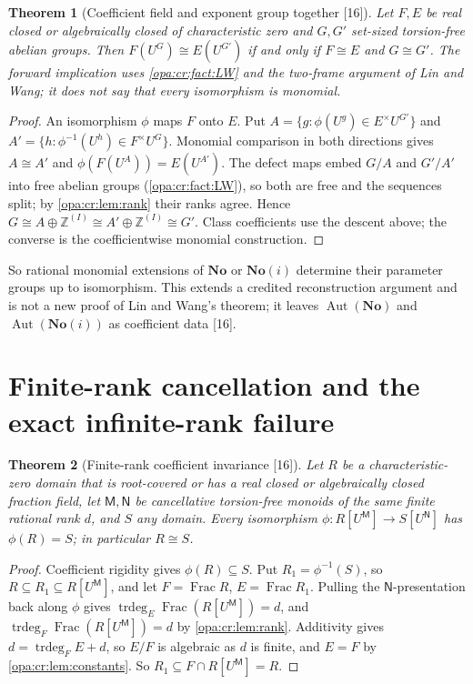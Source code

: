 \documentclass[11pt,oneside]{article}
\numberwithin{equation}{section}
\newtheorem{theorem}{Theorem}[section]
\theoremstyle{definition}
\theoremstyle{remark}
\newcommand{\No}{\mathbf{No}}
\newcommand{\SC}{\mathbf{No}(i)}
\newcommand{\Z}{\mathbb Z}
\newcommand{\Aut}{\operatorname{Aut}}
\newcommand{\Frac}{\operatorname{Frac}}
\newcommand{\trdeg}{\operatorname{trdeg}}
\newcommand{\src}[1]{\textup{\textsf{\small[#1]}}}
\begin{document}
\begin{theorem}[Coefficient field and exponent group together \src{16}]\label{opa:cr:thm:pairrecover}
Let $F,E$ be real closed or algebraically closed of characteristic zero and $G,G'$ set-sized torsion-free abelian groups.
Then $F(U^G)\cong E(U^{G'})$ if and only if $F\cong E$ and $G\cong G'$. The forward implication uses
\cref{opa:cr:fact:LW} and the two-frame argument of Lin and Wang; it does not say that every isomorphism is monomial.
\end{theorem}
\begin{proof}
An isomorphism $\phi$ maps $F$ onto $E$. Put $A=\{g:\phi(U^g)\in E^\times U^{G'}\}$ and $A'=\{h:\phi^{-1}(U^h)\in F^\times U^G\}$.
Monomial comparison in both directions gives $A\cong A'$ and $\phi(F(U^A))=E(U^{A'})$. The defect maps embed $G/A$ and $G'/A'$
into free abelian groups (\cref{opa:cr:fact:LW}), so both are free and the sequences split; by \cref{opa:cr:lem:rank} their
ranks agree. Hence $G\cong A\oplus\Z^{(I)}\cong A'\oplus\Z^{(I)}\cong G'$. Class coefficients use the descent above; the
converse is the coefficientwise monomial construction.
\end{proof}

So rational monomial extensions of $\No$ or $\SC$ determine their parameter groups up to isomorphism. This extends a
credited reconstruction argument and is not a new proof of Lin and Wang's theorem; it leaves $\Aut(\No)$ and $\Aut(\SC)$ as
coefficient data \src{16}.

\section{Finite-rank cancellation and the exact infinite-rank failure}\label{opa:cr:sec:cancellation}

\begin{theorem}[Finite-rank coefficient invariance \src{16}]\label{opa:cr:thm:finitecancel}
Let $R$ be a characteristic-zero domain that is root-covered or has a real closed or algebraically closed fraction field,
let $\mathsf M,\mathsf N$ be cancellative torsion-free monoids of the same finite rational rank $d$, and $S$ any domain. Every
isomorphism $\phi:R[U^{\mathsf M}]\to S[U^{\mathsf N}]$ has $\phi(R)=S$; in particular $R\cong S$.
\end{theorem}
\begin{proof}
Coefficient rigidity gives $\phi(R)\subseteq S$. Put $R_1=\phi^{-1}(S)$, so $R\subseteq R_1\subseteq R[U^{\mathsf M}]$, and let $F=\Frac R$,
$E=\Frac R_1$. Pulling the $\mathsf N$-presentation back along $\phi$ gives $\trdeg_E\Frac(R[U^{\mathsf M}])=d$, and
$\trdeg_F\Frac(R[U^{\mathsf M}])=d$ by \cref{opa:cr:lem:rank}. Additivity gives $d=\trdeg_FE+d$, so $E/F$ is algebraic as $d$ is
finite, and $E=F$ by \cref{opa:cr:lem:constants}. So $R_1\subseteq F\cap R[U^{\mathsf M}]=R$.
\end{proof}
\end{document}

